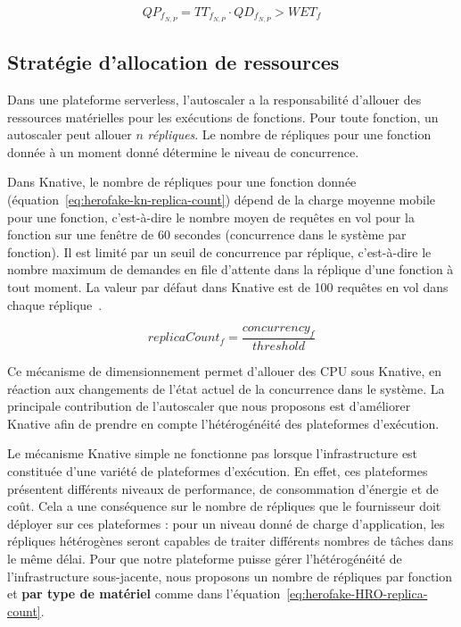 \begin{equation}
    QP_{f_{N, P}} = TT_{f_{N, P}} \cdot QD_{f_{N, P}} > WET_{f}
\label{eq:herofake-task-penalty}
\end{equation}

\subsection{Stratégie d'allocation de ressources} \label{section:herofake-autoscaling-strategy}

Dans une plateforme serverless, l'autoscaler a la responsabilité d'allouer des ressources matérielles pour les exécutions de fonctions. Pour toute fonction, un autoscaler peut allouer $n$ \textit{répliques}. Le nombre de répliques pour une fonction donnée à un moment donné détermine le niveau de concurrence.

Dans Knative, le nombre de répliques pour une fonction donnée (équation~\ref{eq:herofake-kn-replica-count}) dépend de la charge moyenne mobile pour une fonction, c'est-à-dire le nombre moyen de requêtes en vol pour la fonction sur une fenêtre de 60 secondes (concurrence dans le système par fonction). Il est limité par un seuil de concurrence par réplique, c'est-à-dire le nombre maximum de demandes en file d'attente dans la réplique d'une fonction à tout moment. La valeur par défaut dans Knative est de 100 requêtes en vol dans chaque réplique~\cite{knative-autoscaling}.

\begin{equation}
    replicaCount_{f} = \frac{concurrency_{f}}{threshold}
\label{eq:herofake-kn-replica-count}
\end{equation}

Ce mécanisme de dimensionnement permet d'allouer des CPU sous Knative, en réaction aux changements de l'état actuel de la concurrence dans le système. La principale contribution de l'autoscaler que nous proposons est d'améliorer Knative afin de prendre en compte l'hétérogénéité des plateformes d'exécution.

Le mécanisme Knative simple ne fonctionne pas lorsque l'infrastructure est constituée d'une variété de plateformes d'exécution. En effet, ces plateformes présentent différents niveaux de performance, de consommation d'énergie et de coût. Cela a une conséquence sur le nombre de répliques que le fournisseur doit déployer sur ces plateformes : pour un niveau donné de charge d'application, les répliques hétérogènes seront capables de traiter différents nombres de tâches dans le même délai. Pour que notre plateforme puisse gérer l'hétérogénéité de l'infrastructure sous-jacente, nous proposons un nombre de répliques par fonction et \textbf{par type de matériel} comme dans l'équation~\ref{eq:herofake-HRO-replica-count}.

